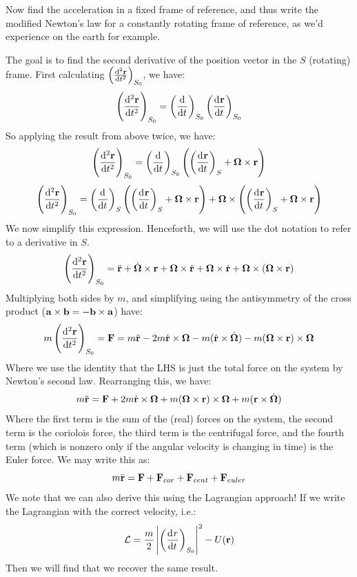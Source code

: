 \documentclass[../PHYS306Notes.tex]{subfiles}
\begin{document}
\begin{p}
Now find the acceleration in a fixed frame of reference, and thus write the modified Newton’s law for a constantly rotating frame of reference, as we’d experience on the earth for example. 
\end{p}
\begin{s}
The goal is to find the second derivative of the position vector in the $S$ (rotating) frame. First calculating $\left(\od[2]{\v{r}}{t}\right)_{S_0}$, we have:
\[\left(\dod[2]{\v{r}}{t}\right)_{S_0} = \left(\dod{}{t}\right)_{S_0}\left(\dod{\v{r}}{t}\right)_{S_0}\]
So applying the result from above twice, we have:
\[\left(\dod[2]{\v{r}}{t}\right)_{S_0} = \left(\dod{}{t}\right)_{S_0}\left(\left(\dod{\v{r}}{t}\right)_S + \bm{\Omega} \times \v{r}\right)\]
\[\left(\dod[2]{\v{r}}{t}\right)_{S_0} = \left(\dod{}{t}\right)_{S}\left(\left(\dod{\v{r}}{t}\right)_S + \bm{\Omega} \times \v{r}\right) + \bm{\Omega}\times \left(\left(\dod{\v{r}}{t}\right)_S + \bm{\Omega} \times \v{r}\right)\]
We now simplify this expression. Henceforth, we will use the dot notation to refer to a derivative in $S$. \[\left(\dod[2]{\v{r}}{t}\right)_{S_0} =
\ddot{\v{r}} + \dot{\bm{\Omega}}\times \v{r} + \bm{\Omega} \times \dot{\v{r}} + \bm{\Omega} \times \dot{\v{r}} + \bm{\Omega} \times (\bm{\Omega} \times \v{r})\]
Multiplying both sides by $m$, and simplifying using the antisymmetry of the cross product ($\mathbf{a} \times \mathbf{b} = -\mathbf{b} \times \mathbf{a}$) have:
\[m\left(\dod[2]{\v{r}}{t}\right)_{S_0} = \v{F} = 
m\ddot{\v{r}} - 2m\dot{\v{r}}\times\bm{\Omega} - m(\dot{\v{r}}\times \dot{\bm{\Omega}}) - m(\bm{\Omega} \times \v{r}) \times \bm{\Omega}\] 
Where we use the identity that the LHS is just the total force on the system by Newton's second law. Rearranging this, we have:
\[m\ddot{\mathbf{r}} = \mathbf{F} + 2m\dot{\mathbf{r}}\times \bm{\Omega} + m(\bm{\Omega} \times \mathbf{r})\times \bm{\Omega} + m(\mathbf{r} \times \dot{\bm{\Omega}})\]
Where the first term is the sum of the (real) forces on the system, the second term is the coriolois force, the third term is the centrifugal force, and the fourth term (which is nonzero only if the angular velocity is changing in time) is the Euler force. We may write this as:
\[m\ddot{\mathbf{r}} = \mathbf{F} + \mathbf{F}_{cor} + \mathbf{F}_{cent} + \mathbf{F}_{euler}\]
We note that we can also derive this using the Lagrangian approach! If we write the Lagrangian with the correct velocity, i.e.:
\[\LL = \frac{m}{2}\left|\left(\dod{r}{t}\right)_{S_0}\right|^2 - U(\v{r})\]
Then we will find that we recover the same result.

\end{s}
\end{document}
